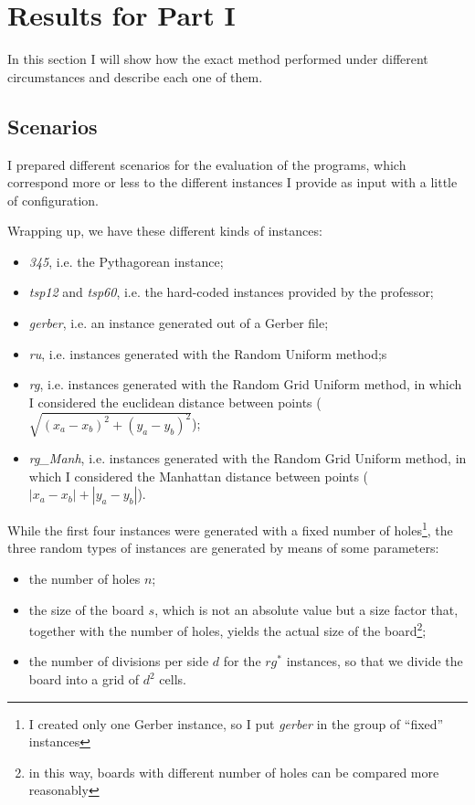 \section{Results for Part I}

In this section I will show how the exact method performed under different
circumstances and describe each one of them.

\subsection{Scenarios} \label{sec:resI-scenarios}

I prepared different scenarios for the evaluation of the programs, which
correspond more or less to the different instances I provide as input with a
little of configuration.

Wrapping up, we have these different kinds of instances:

\begin{itemize}
  \item \textit{345}, i.e. the Pythagorean instance;
  \item \textit{tsp12} and \textit{tsp60}, i.e. the hard-coded instances
    provided by the professor;
  \item \textit{gerber}, i.e. an instance generated out of a Gerber file;
  \item \textit{ru}, i.e. instances generated with the Random Uniform method;s
  \item \textit{rg}, i.e. instances generated with the Random Grid Uniform
    method, in which I considered the euclidean distance between points
    ($\sqrt{(x_a - x_b)^2 + (y_a - y_b)^2}$);
  \item \textit{rg\_Manh}, i.e. instances generated with the Random Grid Uniform
    method, in which I considered the Manhattan distance between points
    ($|x_a - x_b| + |y_a - y_b|$).
\end{itemize}

While the first four instances were generated with a fixed number of
holes\footnote{I created only one Gerber instance, so I put \textit{gerber} in
the group of ``fixed'' instances}, the three random types of instances are
generated by means of some parameters:

\begin{itemize}
  \item the number of holes $n$;
  \item the size of the board $s$, which is not an absolute value but a size
    factor that, together with the number of holes, yields the actual size of
    the board\footnote{in this way, boards with different number of holes can
    be compared more reasonably};
  \item the number of divisions per side $d$ for the $rg^*$ instances, so that
    we divide the board into a grid of $d^2$ cells.
\end{itemize}

